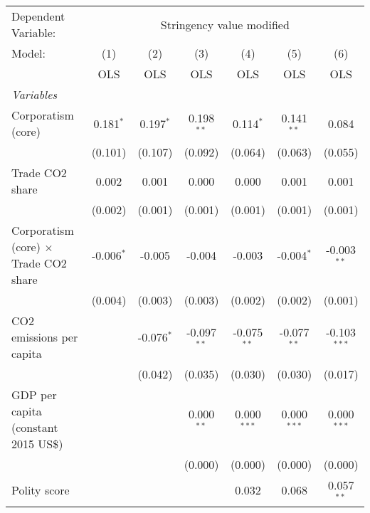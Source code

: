 
\begingroup
\centering
\begin{tabular}{lcccccc}
   \toprule
   Dependent Variable: & \multicolumn{6}{c}{Stringency value modified}\\
   Model:                                       & (1)          & (2)          & (3)           & (4)           & (5)           & (6)\\  
                                                &  OLS         & OLS          & OLS           & OLS           & OLS           & OLS\\  
   \midrule
   \emph{Variables}\\
   Corporatism (core)                           & 0.181$^{*}$  & 0.197$^{*}$  & 0.198$^{**}$  & 0.114$^{*}$   & 0.141$^{**}$  & 0.084\\   
                                                & (0.101)      & (0.107)      & (0.092)       & (0.064)       & (0.063)       & (0.055)\\   
   Trade CO2 share                              & 0.002        & 0.001        & 0.000         & 0.000         & 0.001         & 0.001\\   
                                                & (0.002)      & (0.001)      & (0.001)       & (0.001)       & (0.001)       & (0.001)\\   
   Corporatism (core) $\times$ Trade CO2 share  & -0.006$^{*}$ & -0.005       & -0.004        & -0.003        & -0.004$^{*}$  & -0.003$^{**}$\\   
                                                & (0.004)      & (0.003)      & (0.003)       & (0.002)       & (0.002)       & (0.001)\\   
   CO2 emissions per capita                     &              & -0.076$^{*}$ & -0.097$^{**}$ & -0.075$^{**}$ & -0.077$^{**}$ & -0.103$^{***}$\\   
                                                &              & (0.042)      & (0.035)       & (0.030)       & (0.030)       & (0.017)\\   
   GDP per capita (constant 2015 US\$)          &              &              & 0.000$^{**}$  & 0.000$^{***}$ & 0.000$^{***}$ & 0.000$^{***}$\\   
                                                &              &              & (0.000)       & (0.000)       & (0.000)       & (0.000)\\   
   Polity score                                 &              &              &               & 0.032         & 0.068         & 0.057$^{**}$\\   

\end{tabular}
